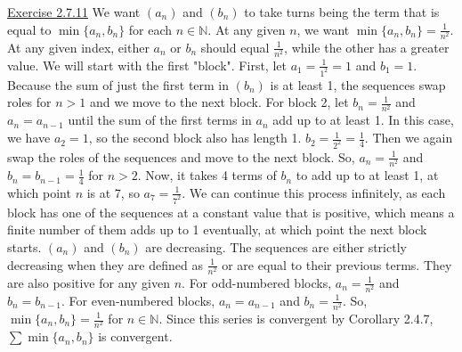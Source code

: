 \documentclass{exam}
\begin{document}
\underline{Exercise 2.7.11}
\newline
\newline
We want $(a_n)$ and $(b_n)$ to take turns being the term that is equal to $\min\{a_n,b_n\}$ for each $n\in\mathbb{N}$. At any given $n$, we want $\min\{a_n,b_n\}=\frac{1}{n^2}$. At any given index, either $a_n$ or $b_n$ should equal $\frac{1}{n^2}$, while the other has a greater value. We will start with the first "block". First, let $a_1=\frac{1}{1^2}=1$ and $b_1=1$. Because the sum of just the first term in $(b_n)$ is at least 1, the sequences swap roles for $n>1$ and we move to the next block. For block 2, let $b_n=\frac{1}{n^2}$ and $a_n=a_{n-1}$ until the sum of the first terms in $a_n$ add up to at least 1. In this case, we have $a_2=1$, so the second block also has length 1. $b_2=\frac{1}{2^2}=\frac{1}{4}$. Then we again swap the roles of the sequences and move to the next block. So, $a_n=\frac{1}{n^2}$ and $b_n=b_{n-1}=\frac{1}{4}$ for $n>2$. Now, it takes 4 terms of $b_n$ to add up to at least 1, at which point $n$ is at 7, so $a_7=\frac{1}{7^2}$. We can continue this process infinitely, as each block has one of the sequences at a constant value that is positive, which means a finite number of them adds up to 1 eventually, at which point the next block starts. $(a_n)$ and $(b_n)$ are decreasing. The sequences are either strictly decreasing when they are defined as $\frac{1}{n^2}$ or are equal to their previous terms. They are also positive for any given $n$. For odd-numbered blocks, $a_n=\frac{1}{n^2}$ and $b_n=b_{n-1}$. For even-numbered blocks, $a_n=a_{n-1}$ and $b_n=\frac{1}{n^2}$. So, $\min\{a_n,b_n\}=\frac{1}{n^2}$ for $n\in\mathbb{N}$. Since this series is convergent by Corollary 2.4.7, $\sum\min\{a_n,b_n\}$ is convergent.
\end{document}
